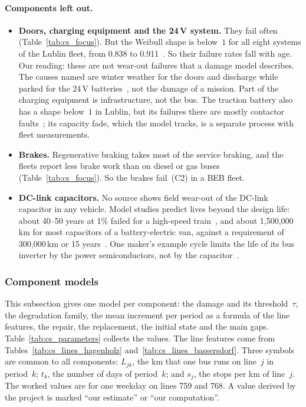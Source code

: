 \documentclass[11pt,a4paper]{article}
\theoremstyle{plain}
\theoremstyle{definition}
\theoremstyle{remark}
\begin{document}
\paragraph{Components left out.}
\begin{itemize}
  \item \textbf{Doors, charging equipment and the 24\,V system.}
    They fail often (Table~\ref{tab:cs_focus}).
    But the Weibull shape is below~$1$ for all eight systems of the Lublin fleet, from 0.838 to 0.911~\cite[Table~8]{Niewczas2025reliability}.
    So their failure rates fall with age.
    Our reading: these are not wear-out failures that a damage model describes.
    The causes named are winter weather for the doors and discharge while parked for the 24\,V batteries~\cite[Sec.~2]{Niewczas2025reliability}, not the damage of a mission.
    Part of the charging equipment is infrastructure, not the bus.
    The traction battery also has a shape below~$1$ in Lublin, but its failures there are mostly contactor faults~\cite[Sec.~2]{Niewczas2025reliability}; its capacity fade, which the model tracks, is a separate process with fleet measurements.
  \item \textbf{Brakes.}
    Regenerative braking takes most of the service braking, and the fleets report less brake work than on diesel or gas buses (Table~\ref{tab:cs_focus}).
    So the brakes fail~(C2) in a BEB fleet.
  \item \textbf{DC-link capacitors.}
    No source shows field wear-out of the DC-link capacitor in any vehicle.
    Model studies predict lives beyond the design life: about 40--50 years at 1\% failed for a high-speed train~\cite[accepted manuscript, pp.~12--14]{Yao2021}, and about 1,500,000\,km for most capacitors of a battery-electric van, against a requirement of 300,000\,km or 15 years~\cite[accepted manuscript, pp.~3,~18]{Chakraborty2022}.
    One maker's example cycle limits the life of its bus inverter by the power semiconductors, not by the capacitor~\cite{Backhaus2011}.
\end{itemize}

\subsubsection{Component models}\label{sec:cs_components}

This subsection gives one model per component: the damage and its threshold~$\tau$, the degradation family, the mean increment per period as a formula of the line features, the repair, the replacement, the initial state and the main gaps.
Table~\ref{tab:cs_parameters} collects the values.
The line features come from Tables~\ref{tab:cs_lines_hagenholz} and~\ref{tab:cs_lines_bassersdorf}.
Three symbols are common to all components: $L_{jk}$, the km that one bus runs on line~$j$ in period~$k$; $t_k$, the number of days of period~$k$; and $s_j$, the stops per km of line~$j$.
The worked values are for one weekday on lines 759 and 768.
A value derived by the project is marked ``our estimate'' or ``our computation''.
\end{document}
